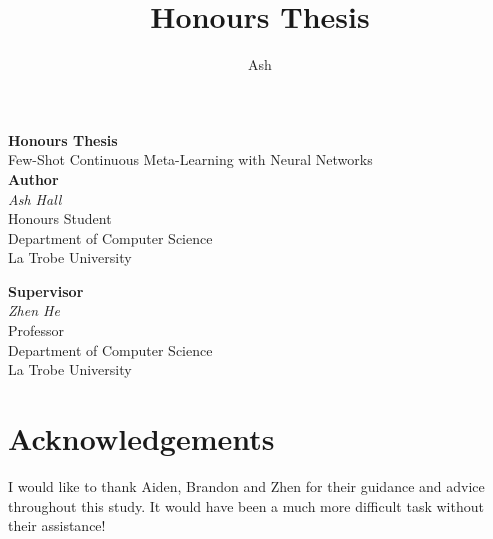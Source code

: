 \documentclass{report}
\title{Honours Thesis}
\author{Ash}
\begin{document}
\begin{titlepage}
 \begin{center}
  \vspace*{5cm}
  {\huge \textbf{Honours Thesis}} \\
  \vspace{0.3cm}
  {\large Few-Shot Continuous Meta-Learning with Neural Networks} \\
  \vspace*{2cm}
  \textbf{Author} \\
  \textit{Ash Hall} \\
  Honours Student \\
  Department of Computer Science \\
  La Trobe University \\
  \vspace{0.75cm}

  \textbf{Supervisor} \\
  \textit{Zhen He} \\
  Professor \\
  Department of Computer Science \\
  La Trobe University \\


  \vfill
 \end{center}
\end{titlepage}

\chapter*{Acknowledgements}
\thispagestyle{empty}
I would like to thank Aiden, Brandon and Zhen for their guidance and advice throughout this study. It would have been a much more difficult task without their assistance!

\clearpage


\thispagestyle{empty}
\newpage
\thispagestyle{empty}
\tableofcontents
\newpage
\thispagestyle{empty}
\listoffigures
\newpage
\end{document}
